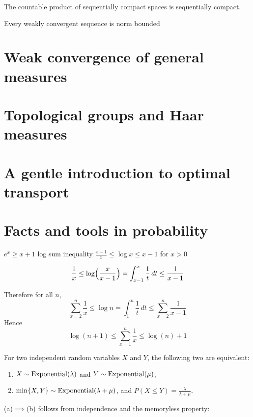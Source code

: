 \begin{thm}
    The countable product of sequentially compact spaces is sequentially compact.
\end{thm}

Every weakly convergent sequence is norm bounded

\section{Weak convergence of general measures} \label{sec:weak-conv-general-meas}

\section{Topological groups and Haar measures}

\section{A gentle introduction to optimal transport}

\section{Facts and tools in probability}
$e^x \geq x + 1$ log sum inequality
$\frac{x-1}{x}\leq \log x \leq x - 1$ for $x > 0$

\[\frac{1}{x}\leq \log\Bigl(\frac{x}{x-1}\Bigr) = \int_{x-1}^x \frac{1}{t}\,dt\leq \frac{1}{x-1}\]

Therefore for all $n$, \[
    \sum_{x=2}^n \frac{1}{x} \leq \log n = \int_1^n \frac{1}{t}\,dt \leq \sum_{x=2}^n \frac{1}{x-1}
\]
Hence \[
    \log(n+1) \leq \sum_{x=1}^n\frac{1}{x}\leq \log(n) +1
\]


For two independent random variables $X$ and $Y$, the following two are equivalent: 
\begin{enumerate}
    \item $X\sim \operatorname{Exponential}(\lambda)$ and $Y\sim \operatorname{Exponential}(\mu)$, 
    \item $\min\{X,Y\} \sim \operatorname{Exponential}(\lambda + \mu)$, and $P(X \leq Y) = \frac{\lambda}{\lambda + \mu}$.
\end{enumerate}

(a)$\implies$(b) follows from independence and the memoryless property: 

\begin{namedthm}
    
\end{namedthm}

